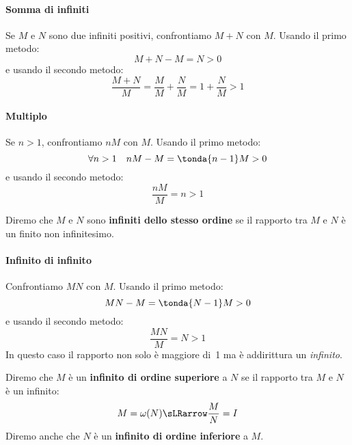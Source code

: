 \paragraph{Somma di infiniti}
Se \(M\) e \(N\) sono due infiniti positivi, confrontiamo \(M+N\) 
con \(M\). 
Usando il primo metodo:
\[M+N-M = N > 0\]
e usando il secondo metodo: 
\[\frac{M+N}{M} =
  \frac{M}{M} + \frac{N}{M} = 
  1 + \frac{N}{M} > 1\]
\paragraph{Multiplo}
Se \(n>1\), confrontiamo \(nM\) con \(M\). 
Usando il primo metodo:
\[\forall n>1 \quad nM-M = \tonda{n-1}M > 0\]
e usando il secondo metodo: 
\[\frac{nM}{M} = n > 1\]
\begin{definizione}
 Diremo che \(M\) e \(N\) sono \textbf{infiniti dello stesso ordine}  
se il rapporto tra \(M\) e \(N\) è un finito non infinitesimo.
\end{definizione}
\paragraph{Infinito di infinito}
Confrontiamo \(MN\) con \(M\). 
Usando il primo metodo:
\[MN-M = \tonda{N-1}M > 0\]
e usando il secondo metodo: 
\[\frac{MN}{M} = N > 1\]
In questo caso il rapporto non solo è maggiore di~1 ma è addirittura un 
\emph{infinito}. 
\begin{definizione}
 Diremo che \(M\) è un \textbf{infinito di ordine superiore} a 
\(N\) se il rapporto tra \(M\) e \(N\) è un infinito:
\[M=\omega(N) \sLRarrow \frac{M}{N}=I\]
Diremo anche che 
\(N\) è un \textbf{infinito di ordine inferiore} a \(M\).
\end{definizione}
% 
% 

